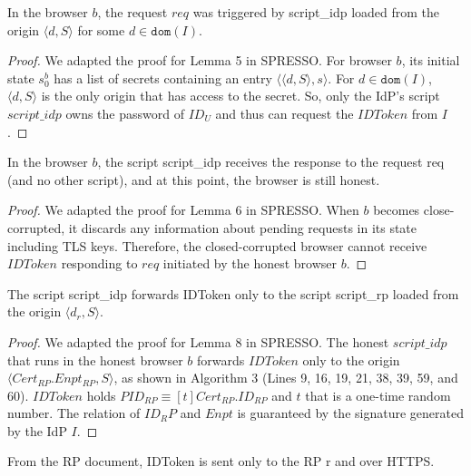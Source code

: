 \begin{lemma}
In the browser $b$, the request $req$ was triggered by script\_idp loaded from the origin $\langle d, S \rangle$ for some $d \in \mathtt{dom}(I)$.
\end{lemma}

\begin{proof}
We adapted the proof for Lemma 5 in SPRESSO. 
For browser $b$, its initial state $s^b_0$ has a list of secrets containing an entry $\langle \langle d, S \rangle, s \rangle$. For $d \in \mathtt{dom}(I)$, $\langle d, S \rangle$ is the only origin that has access to the secret. So, only the IdP's script $script\_idp$ owns the password of $ID_U$ and thus can request the $IDToken$ from $I$.
\end{proof}

\begin{lemma}
In the browser $b$, the script script\_idp receives the response to the request req (and no other script), and at this point, the browser is still honest.
\end{lemma}

\begin{proof}
We adapted the proof for Lemma 6 in SPRESSO. 
When $b$ becomes close-corrupted, it discards any information about pending requests in its state including TLS keys. Therefore, the closed-corrupted browser cannot receive $IDToken$ responding to $req$ initiated by the honest browser $b$.
\end{proof}

\begin{lemma}
The script script\_idp forwards IDToken only to the script script\_rp loaded from the origin $\langle d_r, S \rangle$.
\end{lemma}

\begin{proof}
We adapted the proof for Lemma 8 in SPRESSO. 
The honest $script\_idp$ that runs in the honest browser $b$ forwards $IDToken$ only to the origin $\langle Cert_{RP}.Enpt_{RP}, S \rangle$, as shown in Algorithm 3%
(Lines 9, 16, 19, 21, 38, 39, 59, and 60). 
$IDToken$ holds $PID_{RP} \equiv [t]Cert_{RP}.ID_{RP}$ and $t$ that is a one-time random number. The relation of $ID_RP$ and $Enpt$ is guaranteed by the signature generated by the IdP $I$. 
\end{proof}

\begin{lemma}
From the RP document, IDToken is sent only to the RP r and over HTTPS.
\end{lemma}

